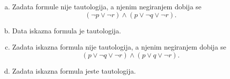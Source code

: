\begin{enumerate}[(a)]
\item Zadata formule nije tautologija, a njenim negiranjem dobija se
\[(\neg p\vee  \neg r)\wedge (p\vee \neg q\vee\neg r).\]

\item Data iskazna formula je tautologija.

\item Zadata iskazna formula nije tautologija, a njenim negiranjem dobija se
\[ (p\vee  \neg q\vee \neg r)\wedge( p\vee  q\vee \neg r).\]

\item Zadata iskazna formula jeste tautologija.

\end{enumerate}

